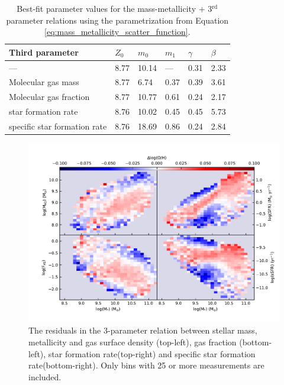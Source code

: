 \documentclass[fleqn,usenatbib]{mnras}
\begin{document}
\begin{table}
 \centering
 \caption{Best-fit parameter values for the mass-metallicity + 3$^{\textrm{rd}}$ parameter relations using the parametrization from Equation \ref{eq:mass_metallicity_scatter_function}.}
 \label{tab:mzr_best_fits}
\begin{tabular}{llllll}
\hline
\hline
\textbf{Third parameter}      & \textbf{$Z_0$} & \textbf{$m_0$} & \textbf{$m_1$} & \textbf{$\gamma$} & \textbf{$\beta$} \\ \hline
---                           & 8.77           & 10.14          & ---            & 0.31              & 2.33             \\
Molecular gas mass            & 8.77           & 6.74           & 0.37           & 0.39              & 3.61             \\
Molecular gas fraction        & 8.77           & 10.77          & 0.61           & 0.24              & 2.17             \\
star formation rate           & 8.76           & 10.02          & 0.45           & 0.45              & 5.73             \\
specific star formation rate  & 8.76           & 18.69          & 0.86           & 0.24              & 2.84             \\
\hline
\end{tabular}
\end{table}

\begin{figure}
    \centering
    \includegraphics[width=2\columnwidth]{figures/fig12.pdf}
    \caption{The residuals in the 3-parameter relation between stellar mass, metallicity and gas surface density (top-left), gas fraction (bottom-left), star formation rate(top-right) and specific star formation rate(bottom-right). Only bins with 25 or more measurements are included.}
    \label{fig:MZR_binned_metallicity_residuals}
\end{figure}
\end{document}
